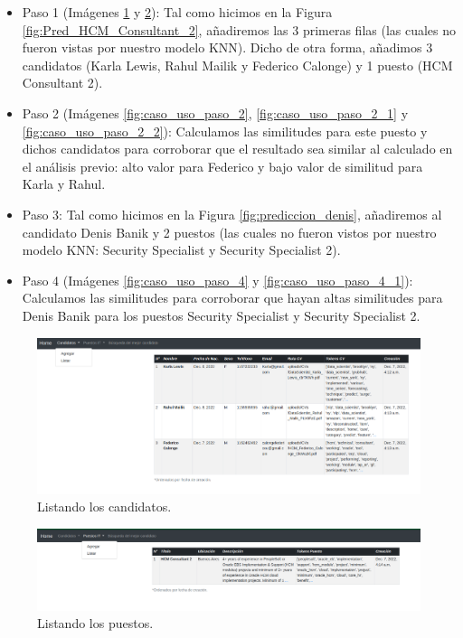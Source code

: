 \documentclass[12pt,a4paper]{article}
\begin{document}
\begin{sloppypar}
\begin{itemize}

\item Paso 1 (Imágenes \ref{fig:caso_uso_paso_1} y \ref{fig:caso_uso_paso_1_2}): Tal como hicimos en la Figura \ref{fig:Pred_HCM_Consultant_2}, añadiremos las 3 primeras filas (las cuales no fueron vistas por nuestro modelo KNN). Dicho de otra forma, añadimos 3 candidatos (Karla Lewis, Rahul Mailik y Federico Calonge) y 1 puesto (HCM Consultant 2).

\item Paso 2 (Imágenes \ref{fig:caso_uso_paso_2}, \ref{fig:caso_uso_paso_2_1} y \ref{fig:caso_uso_paso_2_2}): Calculamos las similitudes para este puesto y dichos candidatos para corroborar que el resultado sea similar al calculado en el análisis previo: alto valor para Federico y bajo valor de similitud para Karla y Rahul.  

\item Paso 3: Tal como hicimos en la Figura \ref{fig:prediccion_denis}, añadiremos al candidato Denis Banik y 2 puestos (las cuales no fueron vistos por nuestro modelo KNN: Security Specialist y Security Specialist 2).

\item Paso 4 (Imágenes \ref{fig:caso_uso_paso_4} y \ref{fig:caso_uso_paso_4_1}): Calculamos las similitudes para corroborar que hayan altas similitudes para Denis Banik para los puestos Security Specialist y Security Specialist 2.

\end{itemize}

\begin{figure}[H]    %
 \centering
 \includegraphics[width=1\textwidth]{images/implementacion_web/caso_uso_paso_1.png}
 \caption{Listando los candidatos.} 
 \label{fig:caso_uso_paso_1}
\end{figure}

\begin{figure}[H]    %
 \centering
 \includegraphics[width=1\textwidth]{images/implementacion_web/caso_uso_paso_1_2.png}
 \caption{Listando los puestos.} 
 \label{fig:caso_uso_paso_1_2}
\end{figure}


\end{sloppypar}
\end{document}
